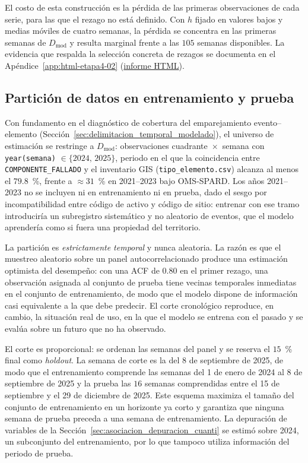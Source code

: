El costo de esta construcción es la pérdida de las primeras observaciones de cada serie, para las que el rezago no está definido. Con $h$ fijado en valores bajos y medias móviles de cuatro semanas, la pérdida se concentra en las primeras semanas de $D_{\mathrm{mod}}$ y resulta marginal frente a las $105$ semanas disponibles. La evidencia que respalda la selección concreta de rezagos se documenta en el Apéndice~\ref{app:html-etapa4-02} (\href{\urlEtapaCuatroDos}{informe HTML}).

\subsection{Partición de datos en entrenamiento y prueba}
\label{sec:particion_train_test}
Con fundamento en el diagnóstico de cobertura del emparejamiento evento--elemento (Sección~\ref{sec:delimitacion_temporal_modelado}), el universo de estimación se restringe a $D_{\mathrm{mod}}$: observaciones cuadrante~$\times$~semana con \texttt{year(semana)} $\in \{2024,\,2025\}$, periodo en el que la coincidencia entre \texttt{COMPONENTE\_FALLADO} y el inventario GIS (\texttt{tipo\_elemento.csv}) alcanza al menos el $79{.}8$~\%, frente a $\approx 31$~\% en 2021--2023 bajo OMS-SPARD. Los años 2021--2023 no se incluyen ni en entrenamiento ni en prueba, dado el sesgo por incompatibilidad entre código de activo y código de sitio: entrenar con ese tramo introduciría un subregistro sistemático y no aleatorio de eventos, que el modelo aprendería como si fuera una propiedad del territorio.

La partición es \textit{estrictamente temporal} y nunca aleatoria. La razón es que el muestreo aleatorio sobre un panel autocorrelacionado produce una estimación optimista del desempeño: con una ACF de $0{.}80$ en el primer rezago, una observación asignada al conjunto de prueba tiene vecinas temporales inmediatas en el conjunto de entrenamiento, de modo que el modelo dispone de información casi equivalente a la que debe predecir. El corte cronológico reproduce, en cambio, la situación real de uso, en la que el modelo se entrena con el pasado y se evalúa sobre un futuro que no ha observado.

El corte es proporcional: se ordenan las semanas del panel y se reserva el $15$~\% final como \emph{holdout}. La semana de corte es la del 8 de septiembre de 2025, de modo que el entrenamiento comprende las semanas del 1 de enero de 2024 al 8 de septiembre de 2025 y la prueba las $16$ semanas comprendidas entre el 15 de septiembre y el 29 de diciembre de 2025. Este esquema maximiza el tamaño del conjunto de entrenamiento en un horizonte ya corto y garantiza que ninguna semana de prueba preceda a una semana de entrenamiento. La depuración de variables de la Sección~\ref{sec:asociacion_depuracion_cuanti} se estimó sobre 2024, un subconjunto del entrenamiento, por lo que tampoco utiliza información del periodo de prueba.

